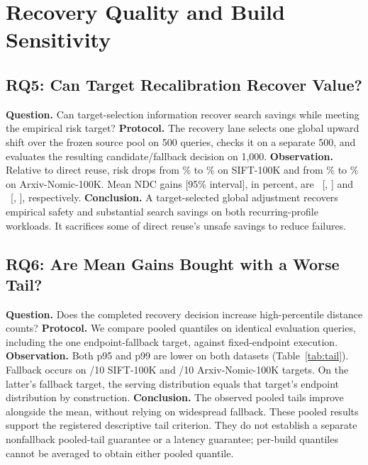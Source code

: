 \section{Recovery Quality and Build Sensitivity}
\label{sec:recovery-quality}

\subsection{RQ5: Can Target Recalibration Recover Value?}
\textbf{Question.} Can target-selection information recover search savings while meeting the empirical risk target?
\textbf{Protocol.} The recovery lane selects one global upward shift over the frozen source pool on 500 queries, checks it on a separate 500, and evaluates the resulting candidate/fallback decision on 1,000.
\textbf{Observation.} Relative to direct reuse, risk drops from \WZeroSiftSourceRisk\% to \WZeroSiftTargetRisk\% on SIFT-100K and from \WZeroArxivSourceRisk\% to \WZeroArxivTargetRisk\% on Arxiv-Nomic-100K. Mean NDC gains [95\% interval], in percent, are \WZeroSiftTargetGain\ [\WZeroSiftTargetGainLow, \WZeroSiftTargetGainHigh] and \WZeroArxivTargetGain\ [\WZeroArxivTargetGainLow, \WZeroArxivTargetGainHigh], respectively.
\textbf{Conclusion.} A target-selected global adjustment recovers empirical safety and substantial search savings on both recurring-profile workloads. It sacrifices some of direct reuse's unsafe savings to reduce failures.

\subsection{RQ6: Are Mean Gains Bought with a Worse Tail?}
\textbf{Question.} Does the completed recovery decision increase high-percentile distance counts?
\textbf{Protocol.} We compare pooled quantiles on identical evaluation queries, including the one endpoint-fallback target, against fixed-endpoint execution.
\textbf{Observation.} Both p95 and p99 are lower on both datasets (Table~\ref{tab:tail}). Fallback occurs on \WZeroSiftTargetFallbackBuilds/10 SIFT-100K and \WZeroArxivTargetFallbackBuilds/10 Arxiv-Nomic-100K targets. On the latter's fallback target, the serving distribution equals that target's endpoint distribution by construction.
\textbf{Conclusion.} The observed pooled tails improve alongside the mean, without relying on widespread fallback. These pooled results support the registered descriptive tail criterion. They do not establish a separate nonfallback pooled-tail guarantee or a latency guarantee; per-build quantiles cannot be averaged to obtain either pooled quantile.

